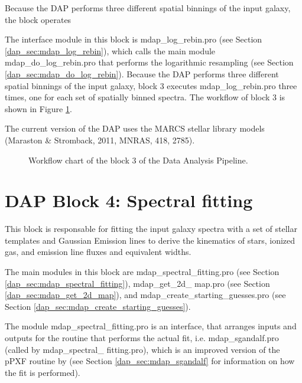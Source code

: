 \documentclass[11pt]{book}
\begin{document}
Because the DAP performs three different spatial binnings of the input
galaxy, the block operates

The interface module in this block is mdap\_log\_rebin.pro (see
Section \ref{dap_sec:mdap_log_rebin}), which calls the main module
mdap\_do\_log\_rebin.pro that performs the logarithmic resampling (see
Section \ref{dap_sec:mdap_do_log_rebin}). Because the DAP performs
three different spatial binnings of the input galaxy, block 3 executes
mdap\_log\_rebin.pro three times, one for each set of spatially binned
spectra. The workflow of block 3 is shown in Figure
\ref{dap_fig:block3}.

The current version of the DAP uses the MARCS stellar library models
(Maraston \& Stromback, 2011, MNRAS, 418, 2785).

\begin{figure}
\begin{center}
\caption{Workflow chart of the block 3 of the Data Analysis
  Pipeline.}
 \label{dap_fig:block3}
\end{center}
\end{figure}



\section{DAP Block 4: Spectral fitting}

This block is responsable for fitting the input galaxy spectra with a
set of stellar templates and Gaussian Emission lines to derive the
kinematics of stars, ionized gas, and emission line fluxes and
equivalent widths.

The main modules in this block are mdap\_spectral\_fitting.pro (see
Section \ref{dap_sec:mdap_spectral_fitting}), mdap\_get\_2d\_ map.pro
(see Section \ref{dap_sec:mdap_get_2d_map}), and
mdap\_create\_starting\_guesses.pro (see Section
\ref{dap_sec:mdap_create_starting_guesses}).

The module mdap\_spectral\_fitting.pro is an interface, that arranges
inputs and outputs for the routine that performs the actual fit, i.e.
mdap\_sgandalf.pro (called by mdap\_spectral\_ fitting.pro), which is
an improved version of the pPXF routine by \citet{Cappellari+04} (see
Section \ref{dap_sec:mdap_sgandalf} for information on how the fit is
performed).
\end{document}
